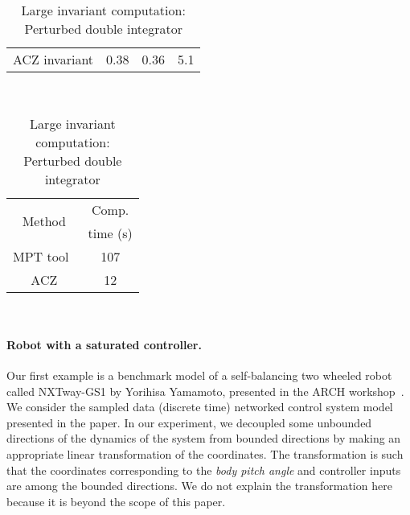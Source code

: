 \begin{table}
\begin{minipage}{0.45\textwidth}
\begin{tabular}{|l|c|c|c|c|}
\hline
\multicolumn{2}{|c|}{\multirow{2}{*}{ACZ invariant}} &
\multirow{2}{*}{0.38} & \multirow{2}{*}{0.36} & 
\multirow{2}{*}{5.1}\\
\multicolumn{2}{|c|}{} & & &\\
\hline
\end{tabular}
\caption{Small invariant computation:\newline Perturbed double
  integrator}
~\label{tab:smallinv-pdi}
\end{minipage}
\hspace{4em}
\begin{minipage}{0.4\textwidth}
\begin{tabular}{|c|c|}
\hline
\multirow{2}{*}{Method} & Comp.\\
& time (s)\\
\hline
\multirow{2}{*}{MPT tool~\cite{rakovic2004computation}} & \multirow{2}{*}{107}\\
& \\
\hline
\multirow{2}{*}{ACZ} & \multirow{2}{*}{12}\\
& \\
\hline
\end{tabular}
\caption{Large invariant computation: Perturbed double integrator}
~\label{tab:largeinv-pdi}
\end{minipage}
\vspace{-4em}
\end{table}

\paragraph{Robot with a saturated controller.}  Our first example is a benchmark
model of a self-balancing two wheeled robot called NXTway-GS1 by
Yorihisa Yamamoto, presented in the ARCH
workshop~\cite{heinz2014benchmark}. We consider the sampled data
(discrete time) networked control system model presented in the
paper. In our experiment, we decoupled some unbounded directions of
the dynamics of the system from bounded directions by making an
appropriate linear transformation of the coordinates.  The
transformation is such that the coordinates corresponding to
the \emph{body pitch angle} and controller inputs are among the
bounded directions.  We do not explain the transformation here because
it is beyond the scope of this paper.  %
%

